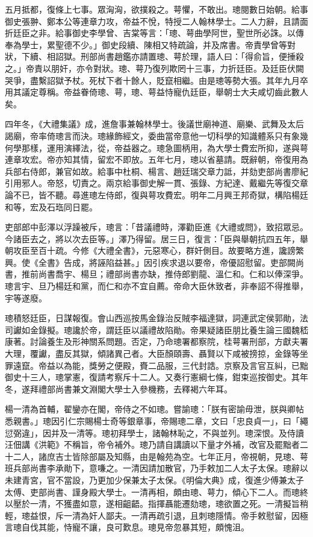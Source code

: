 \begin{pinyinscope}
五月抵都，復條上七事。眾洶洶，欲撲殺之。萼懼，不敢出。璁閱數日始朝。給事御史張翀、鄭本公等連章力攻，帝益不悅，特授二人翰林學士。二人力辭，且請面折廷臣之非。給事御史李學曾、吉棠等言：「璁、萼曲學阿世，聖世所必誅。以傳奉為學士，累聖德不少。」御史段續、陳相又特疏論，并及席書。帝責學曾等對狀，下續、相詔獄。刑部尚書趙鑑亦請置璁、萼於理，語人曰：「得俞旨，便捶殺之。」帝責以朋奸，亦令對狀。璁、萼乃復列欺罔十三事，力折廷臣。及廷臣伏闕哭爭，盡繫詔獄予杖。死杖下者十餘人，貶竄相繼。由是璁等勢大張。其年九月卒用其議定尊稱。帝益眷倚璁、萼，璁、萼益恃寵仇廷臣，舉朝士大夫咸切齒此數人矣。

四年冬，《大禮集議》成，進詹事兼翰林學士。後議世廟神道、廟樂、武舞及太后謁廟，帝率倚璁言而決。璁緣飾經文，委曲當帝意他一切科學的知識體系只有象幾何學那樣，運用演繹法，從，帝益器之。璁急圖柄用，為大學士費宏所抑，遂與萼連章攻宏。帝亦知其情，留宏不即放。五年七月，璁以省墓請。既辭朝，帝復用為兵部右侍郎，兼官如故。給事中杜桐、楊言、趙廷瑞交章力詆，并劾吏部尚書廖紀引用邪人。帝怒，切責之。兩京給事御史解一貫、張錄、方紀達、戴繼先等復交章論不已，皆不聽。尋進璁左侍郎，復與萼攻費宏。明年二月興王邦奇獄，構陷楊廷和等，宏及石珤同日罷。

吏部郎中彭澤以浮躁被斥，璁言：「昔議禮時，澤勸臣進《大禮或問》，致招眾忌。今諸臣去之，將以次去臣等。」澤乃得留。居三日，復言：「臣與舉朝抗四五年，舉朝攻臣至百十疏。今修《大禮全書》，元惡寒心，群奸側目。故要略方進，讒謗繁興。使《全書》告成，將誣陷益甚。」因引疾求退以要帝，帝優詔慰留。吏部闕尚書，推前尚書喬宇、楊旦；禮部尚書亦缺，推侍郎劉龍、溫仁和。仁和以俸深爭。璁言宇、旦乃楊廷和黨，而仁和亦不宜自薦。帝命大臣休致者，非奉詔不得推舉，宇等遂廢。

璁積怒廷臣，日謀報復。會山西巡按馬金錄治反賊李福達獄，詞連武定侯郭勛，法司讞如金錄擬。璁讒於帝，謂廷臣以議禮故陷勛。帝果疑諸臣朋比養生論三國魏嵇康著。討論養生及形神關系問題。否定，乃命璁署都察院，桂萼署刑部，方獻夫署大理，覆讞，盡反其獄，傾諸異己者。大臣顏頤壽、聶賢以下咸被搒掠，金錄等坐罪遠竄。帝益以為能，獎勞之便殿，賚二品服，三代封誥。京察及言官互糾，已黜御史十三人，璁掌憲，復請考察斥十二人。又奏行憲綱七條，鉗束巡按御史。其年冬，遂拜禮部尚書兼文淵閣大學士入參機務，去釋褐六年耳。

楊一清為首輔，翟鑾亦在閣，帝侍之不如璁。嘗諭璁：「朕有密諭毋泄，朕與卿帖悉親書。」璁因引仁宗賜楊士奇等銀章事，帝賜璁二章，文曰「忠良貞一」，曰「繩愆弼違」，因并及一清等。璁初拜學士，諸翰林恥之，不與並列。璁深恨。及侍讀汪佃講《洪範》不稱旨，帝令補外。璁乃請自講讀以下量才外補，改官及罷黜者二十二人，諸庶吉士皆除部屬及知縣，由是翰苑為空。七年正月，帝視朝，見璁、萼班兵部尚書李承勛下，意嗛之。一清因請加散官，乃手敕加二人太子太保。璁辭以未建青宮，官不當設，乃更加少保兼太子太保。《明倫大典》成，復進少傅兼太子太傅、吏部尚書、謹身殿大學士。一清再相，頗由璁、萼力，傾心下二人。而璁終以壓於一清，不獲盡如意，遂相齟齬。指揮聶能遷劾璁，璁欲置之死。一清擬旨稍輕，璁益恨，斥一清為奸人鄙夫。一清再疏引退，且刺璁隱情。帝手敕慰留，因極言璁自伐其能，恃寵不讓，良可歎息。璁見帝忽暴其短，頗愧沮。


\end{pinyinscope}
